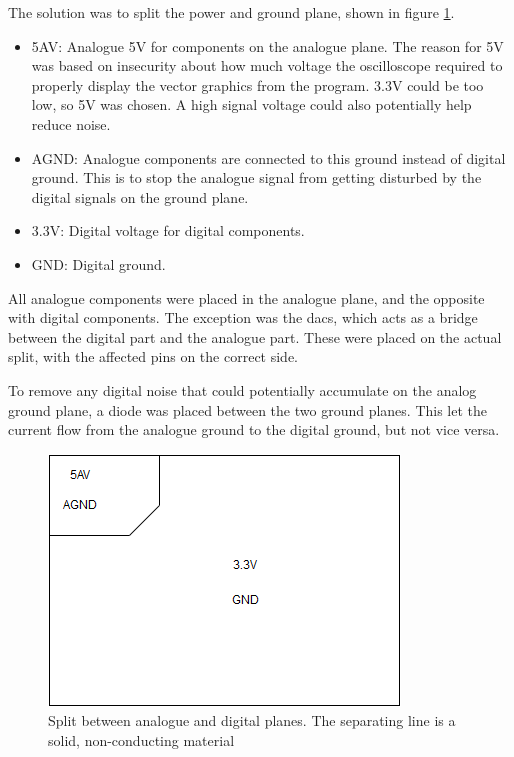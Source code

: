 The solution was to split the power and ground plane, shown in figure \ref{fig:Split planes}. 
\begin{itemize}
\item 5AV: Analogue 5V for components on the analogue plane. 
The reason for 5V was based on insecurity about how much voltage the oscilloscope required to properly display the vector graphics from the program. 
3.3V could be too low, so 5V was chosen. 
A high signal voltage could also potentially help reduce noise.
\item AGND: Analogue components are connected to this ground instead of digital ground. 
This is to stop the analogue signal from getting disturbed by the digital signals on the ground plane.
\item 3.3V: Digital voltage for digital components.
\item GND: Digital ground.
\end{itemize}

All analogue components were placed in the analogue plane, and the opposite with digital components. 
The exception was the \gls{dac}s, which acts as a bridge between the digital part and the analogue part. 
These were placed on the actual split, with the affected pins on the correct side.

To remove any digital noise that could potentially accumulate on the analog ground plane, a diode was placed between the two ground planes. 
This let the current flow from the analogue ground to the digital ground, but not vice versa.

\begin{figure}[h!]
\centering
\includegraphics[scale = 0.6]{images/Split_planes.png}
\caption{Split between analogue and digital planes. The separating line is a solid, non-conducting material}
\label{fig:Split planes}
\end{figure}

